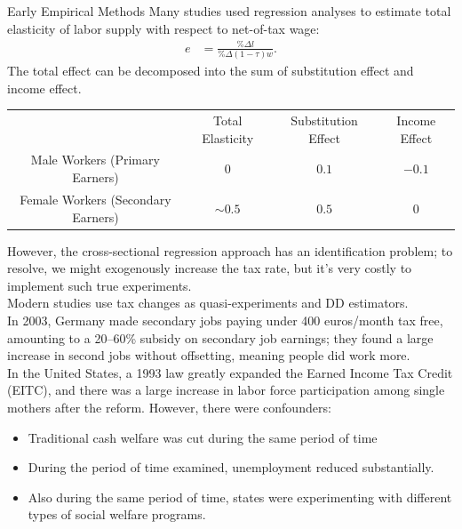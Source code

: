 \documentclass[10pt]{extarticle}
\begin{document}
  \begin{problem}{Early Empirical Methods}
    Many studies used regression analyses to estimate total elasticity of labor supply with respect to net-of-tax wage:
    \begin{align*}
      e &= \frac{\%\Delta l}{\%\Delta(1-\tau)w}.
    \end{align*}
    The total effect can be decomposed into the sum of substitution effect and income effect.
    \begin{center}
      \begin{tabular}{c|c|c|c|}
        & Total Elasticity & Substitution Effect & Income Effect\\
        \cline{2-4}
        Male Workers (Primary Earners) & $0$ & $0.1$ & $-0.1$\\
        Female Workers (Secondary Earners) & $\sim 0.5$ & $0.5$ & $0$
      \end{tabular}
    \end{center}
    However, the cross-sectional regression approach has an identification problem; to resolve, we might exogenously increase the tax rate, but it's very costly to implement such true experiments.\\

    Modern studies use tax changes as quasi-experiments and DD estimators.\\

    In 2003, Germany made secondary jobs paying under 400 euros/month tax free, amounting to a 20--60\% subsidy on secondary job earnings; they found a large increase in second jobs without offsetting, meaning people did work more.\\

    In the United States, a 1993 law greatly expanded the Earned Income Tax Credit (EITC), and there was a large increase in labor force participation among single mothers after the reform. However, there were confounders:
    \begin{itemize}
      \item Traditional cash welfare was cut during the same period of time
      \item During the period of time examined, unemployment reduced substantially.
      \item Also during the same period of time, states were experimenting with different types of social welfare programs.
    \end{itemize}
  \end{problem}
\end{document}
